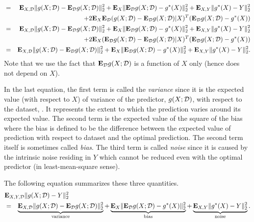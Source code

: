 \begin{eqnarray*}
\\
&=&
	{\bf E{}}_{X,{\mathcal{D}}} \|g(X;{\mathcal{D}}) - {\bf E{}}_{{\mathcal{D}}} g(X; {\mathcal{D}})\|_2^2
	+ {\bf E{}}_{X} \| {\bf E{}}_{{\mathcal{D}}} g(X; {\mathcal{D}}) -g^\ast(X) \|_2^2
	+ {\bf E{}}_{X,Y} \|g^\ast(X)- Y\|_2^2
\\
&&
	+ 2{\bf E{}}_{X} {\bf E{}}_{{\mathcal{D}}} (g(X;{\mathcal{D}}) - {\bf E{}}_{{\mathcal{D}}} g(X; {\mathcal{D}})|X)^T ({\bf E{}}_{{\mathcal{D}}} g(X; {\mathcal{D}}) -g^\ast(X))
\\
&=&
	{\bf E{}}_{X,{\mathcal{D}}} \|g(X;{\mathcal{D}}) - {\bf E{}}_{{\mathcal{D}}} g(X; {\mathcal{D}})\|_2^2
	+ {\bf E{}}_{X} \| {\bf E{}}_{{\mathcal{D}}} g(X; {\mathcal{D}}) -g^\ast(X) \|_2^2
	+ {\bf E{}}_{X,Y} \|g^\ast(X)- Y\|_2^2
\\
&&
	+ 2{\bf E{}}_{X} ({\bf E{}}_{{\mathcal{D}}} g(X;{\mathcal{D}}) - {\bf E{}}_{{\mathcal{D}}} g(X; {\mathcal{D}})|X)^T ({\bf E{}}_{{\mathcal{D}}} g(X; {\mathcal{D}}) -g^\ast(X))
\\
&=&
	{\bf E{}}_{X,{\mathcal{D}}} \|g(X;{\mathcal{D}}) - {\bf E{}}_{{\mathcal{D}}} g(X; {\mathcal{D}})\|_2^2
	+ {\bf E{}}_{X} \| {\bf E{}}_{{\mathcal{D}}} g(X; {\mathcal{D}}) -g^\ast(X) \|_2^2
	+ {\bf E{}}_{X,Y} \|g^\ast(X)- Y\|_2^2.
\end{eqnarray*}
Note that we use the fact that ${\bf E{}}_{{\mathcal{D}}} g(X;{\mathcal{D}})$ is a function of $X$ only
(hence does not depend on $X$).

In the last equation,
the first term is called the \emph{variance} since it is the expected value (with respect to $X$) of variance of the predictor, $g(X;{\mathcal{D}})$,
with respect to the dataset, \dataset.
It represents the extent to which the prediction varies around its expected value.
The second term is the expected value of the square of the bias
where the bias is defined to be the difference between the expected value of prediction with respect to dataset and the optimal prediction.
The second term itself is sometimes called \emph{bias}.
The third term is called \emph{noise} since it is caused by the intrinsic noise residing in $Y$
which cannot be reduced even with the optimal predictor (in least-mean-square sense).

The following equation summarizes these three quantities.
\begin{eqnarray}
\label{eq:var-bias-noise}
\lefteqn{
\Expect_{X,Y,\dataset} \|g(X;\dataset) - Y\|_2^2
}
\\
&=&
\underbrace{\Expect_{X,\dataset} \|g(X;\dataset) - \Expect_\dataset g(X; \dataset)\|_2^2}_\text{variance}
+
\underbrace{\Expect_{X} \| \Expect_\dataset g(X; \dataset) -g^\ast(X) \|_2^2}_\text{bias}
+
\underbrace{\Expect_{X,Y} \|g^\ast(X)- Y\|_2^2}_\text{noise}.
\nonumber
\end{eqnarray}

